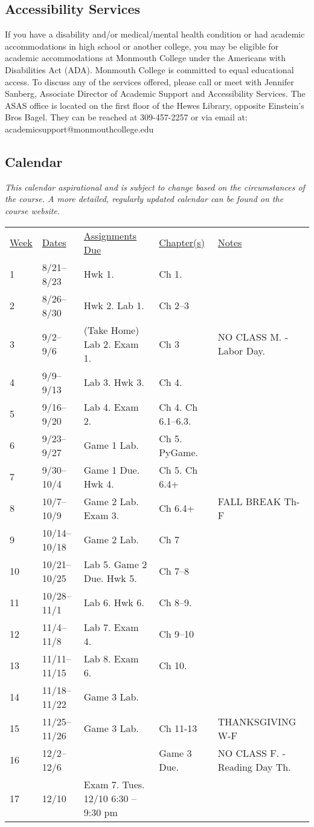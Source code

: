\documentclass[10pt]{article}
\begin{document}
\subsection*{Accessibility Services}
If you have a disability and/or medical/mental health condition or had academic accommodations in high school or another college, you may be eligible for academic accommodations at Monmouth College under the Americans with Disabilities Act (ADA). Monmouth College is committed to equal educational access. To discuss any of the services offered, please call or meet with Jennifer Sanberg, Associate Director of Academic Support and Accessibility Services. The ASAS office is located on the first floor of the Hewes Library, opposite Einstein’s Bros Bagel. They can be reached at 309-457-2257 or via email at: academicsupport@monmouthcollege.edu

\subsection{Calendar}

\textit{This calendar aspirational and is subject to change based on the circumstances of the course. A more detailed, regularly updated calendar can be found on the course website. }

\begin{center}
\begin{tabular}{lllll}
\underline{Week} & \underline{Dates} & \underline{Assignments Due} & \underline{Chapter(s)} & \underline{Notes} \\
1 & 8/21--8/23  & Hwk 1. & Ch 1. &  \\
2 & 8/26--8/30 &  Hwk 2. Lab 1. & Ch 2--3 & \\
3 & 9/2--9/6 & (Take Home) Lab 2. Exam 1. & Ch 3 & NO CLASS M. - Labor Day. \\
4 & 9/9--9/13  & Lab 3. Hwk 3.  &  Ch 4. &  \\
5 & 9/16--9/20 & Lab 4. Exam 2. & Ch 4. Ch 6.1--6.3.  & \\
6 & 9/23--9/27 & Game 1 Lab. & Ch 5. PyGame. & \\
7 & 9/30--10/4 & Game 1 Due. Hwk 4. & Ch 5. Ch 6.4+  & \\
8 & 10/7--10/9 & Game 2 Lab. Exam 3. & Ch 6.4+ & FALL BREAK Th-F  \\
9 & 10/14--10/18 & Game 2 Lab. & Ch 7 & \\
10 & 10/21--10/25  & Lab 5. Game 2 Due. Hwk 5. & Ch 7--8 & \\
11 & 10/28--11/1 & Lab 6. Hwk 6. & Ch 8--9. & \\
12 & 11/4--11/8 & Lab 7. Exam 4. & Ch 9--10  & \\
13 & 11/11--11/15 & Lab 8. Exam 6. &  Ch 10.  & \\
14 & 11/18--11/22 & Game 3 Lab. &  & \\
15 & 11/25--11/26 & Game 3 Lab. & Ch 11-13 & THANKSGIVING W-F \\
16 & 12/2--12/6 & & Game 3 Due. & NO CLASS F. - Reading Day Th.\\
17 & 12/10 & Exam 7. Tues. 12/10 6:30 -- 9:30 pm & &  \\
\end{tabular}
\end{center}
\end{document}
